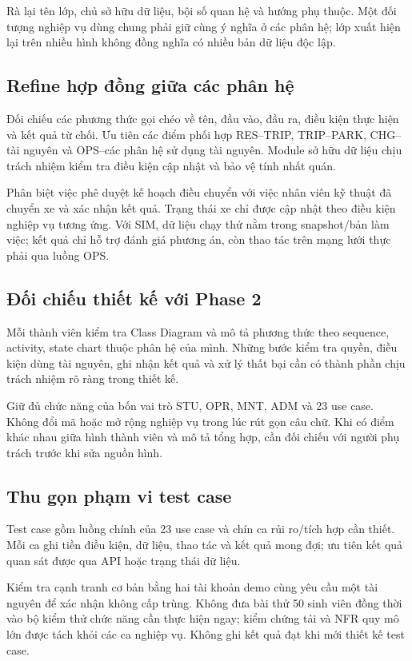 \documentclass[10pt,a4paper]{article}
\begin{document}
Rà lại tên lớp, chủ sở hữu dữ liệu, bội số quan hệ và hướng phụ thuộc. Một đối tượng nghiệp vụ dùng chung phải giữ cùng ý nghĩa ở các phân hệ; lớp xuất hiện lại trên nhiều hình không đồng nghĩa có nhiều bản dữ liệu độc lập.

\subsection{Refine hợp đồng giữa các phân hệ}
Đối chiếu các phương thức gọi chéo về tên, đầu vào, đầu ra, điều kiện thực hiện và kết quả từ chối. Ưu tiên các điểm phối hợp RES--TRIP, TRIP--PARK, CHG--tài nguyên và OPS--các phân hệ sử dụng tài nguyên. Module sở hữu dữ liệu chịu trách nhiệm kiểm tra điều kiện cập nhật và bảo vệ tính nhất quán.

Phân biệt việc phê duyệt kế hoạch điều chuyển với việc nhân viên kỹ thuật đã chuyển xe và xác nhận kết quả. Trạng thái xe chỉ được cập nhật theo điều kiện nghiệp vụ tương ứng. Với SIM, dữ liệu chạy thử nằm trong snapshot/bản làm việc; kết quả chỉ hỗ trợ đánh giá phương án, còn thao tác trên mạng lưới thực phải qua luồng OPS.

\subsection{Đối chiếu thiết kế với Phase 2}
Mỗi thành viên kiểm tra Class Diagram và mô tả phương thức theo sequence, activity, state chart thuộc phân hệ của mình. Những bước kiểm tra quyền, điều kiện dùng tài nguyên, ghi nhận kết quả và xử lý thất bại cần có thành phần chịu trách nhiệm rõ ràng trong thiết kế.

Giữ đủ chức năng của bốn vai trò STU, OPR, MNT, ADM và 23 use case. Không đổi mã hoặc mở rộng nghiệp vụ trong lúc rút gọn câu chữ. Khi có điểm khác nhau giữa hình thành viên và mô tả tổng hợp, cần đối chiếu với người phụ trách trước khi sửa nguồn hình.

\subsection{Thu gọn phạm vi test case}
Test case gồm luồng chính của 23 use case và chín ca rủi ro/tích hợp cần thiết. Mỗi ca ghi tiền điều kiện, dữ liệu, thao tác và kết quả mong đợi; ưu tiên kết quả quan sát được qua API hoặc trạng thái dữ liệu.

Kiểm tra cạnh tranh cơ bản bằng hai tài khoản demo cùng yêu cầu một tài nguyên để xác nhận không cấp trùng. Không đưa bài thử 50 sinh viên đồng thời vào bộ kiểm thử chức năng cần thực hiện ngay; kiểm chứng tải và NFR quy mô lớn được tách khỏi các ca nghiệp vụ. Không ghi kết quả đạt khi mới thiết kế test case.
\end{document}
